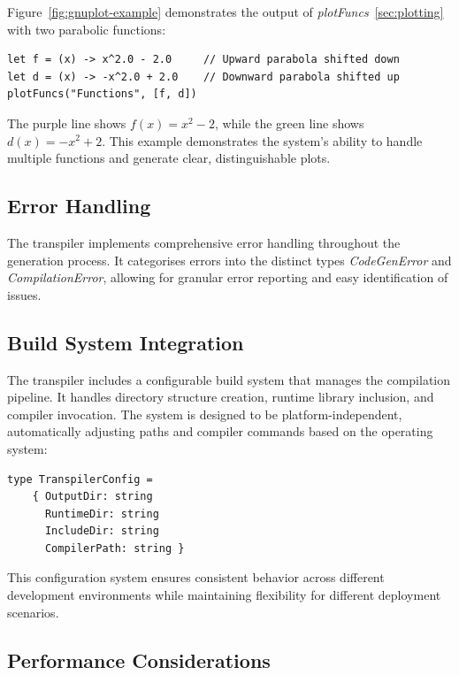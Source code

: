 Figure~\ref{fig:gnuplot-example} demonstrates the output of \textit{plotFuncs}~\ref{sec:plotting} with two parabolic functions:

\begin{verbatim}
let f = (x) -> x^2.0 - 2.0     // Upward parabola shifted down
let d = (x) -> -x^2.0 + 2.0    // Downward parabola shifted up
plotFuncs("Functions", [f, d])
\end{verbatim}

The purple line shows $f(x) = x^2 - 2$, while the green line shows $d(x) = -x^2 + 2$.
This example demonstrates the system's ability to handle multiple functions and generate clear, distinguishable plots.

\subsection{Error Handling}\label{subsec:error-handling}

The transpiler implements comprehensive error handling throughout the generation process. 
It categorises errors into the distinct types \textit{CodeGenError} and \textit{CompilationError}, allowing for
granular error reporting and easy identification of issues.

\subsection{Build System Integration}\label{subsec:build-system-integration}
The transpiler includes a configurable build system that manages the compilation pipeline.
It handles directory structure creation, runtime library inclusion, and compiler invocation.
The system is designed to be platform-independent, automatically adjusting paths and compiler commands based on the operating system:

\begin{verbatim}
type TranspilerConfig =
    { OutputDir: string
      RuntimeDir: string
      IncludeDir: string
      CompilerPath: string }
\end{verbatim}

This configuration system ensures consistent behavior across different development environments while maintaining flexibility for different deployment scenarios.

\subsection{Performance Considerations}\label{subsec:performance-considerations}

